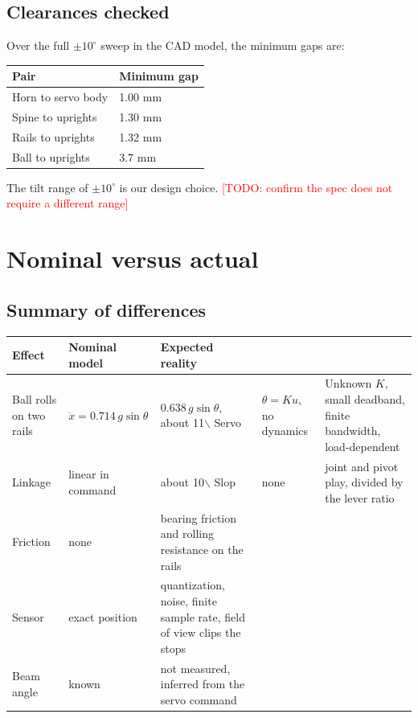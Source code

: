 \documentclass[11pt]{article}
\newcommand{\todo}[1]{\textcolor{red}{[TODO: #1]}}
\newcommand{\todo}[1]{\textcolor{red}{[TODO: #1]}}
\begin{document}
\subsection{Clearances checked}
\label{sec:org3eb6951}
Over the full \(\pm 10^\circ\) sweep in the CAD model, the minimum gaps are:

\begin{center}
\begin{tabularx}{0.7\textwidth}{lY}
Pair & Minimum gap\\
\hline
Horn to servo body & 1.00 mm\\
Spine to uprights & 1.30 mm\\
Rails to uprights & 1.32 mm\\
Ball to uprights & 3.7 mm\\
\end{tabularx}
\end{center}

The tilt range of \(\pm 10^\circ\) is our design choice. \todo{confirm the spec does not require a different range}
\section{Nominal versus actual}
\label{sec:org014f501}
\subsection{Summary of differences}
\label{sec:orga7827dc}
\begin{center}
\begin{tabularx}{\textwidth}{lYY}
Effect & Nominal model & Expected reality\\
\hline
Ball rolls on two rails & \(\ddot{x} = 0.714\,g\sin\theta\) & \(0.638\,g\sin\theta\), about 11$\backslash$%
Servo & \(\theta = K u\), no dynamics & Unknown \(K\), small deadband, finite bandwidth, load-dependent\\
Linkage & linear in command & about 10$\backslash$%
Slop & none & joint and pivot play, divided by the lever ratio\\
Friction & none & bearing friction and rolling resistance on the rails\\
Sensor & exact position & quantization, noise, finite sample rate, field of view clips the stops\\
Beam angle & known & not measured, inferred from the servo command\\
\end{tabularx}
\end{center}
\end{document}
